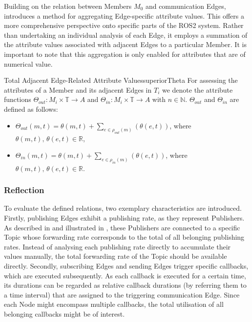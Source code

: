     Building on the relation between Members $M_0$ and communication Edges,  introduces a method for aggregating Edge-specific attribute values. This offers a more comprehensive perspective onto specific parts of the ROS2 system. Rather than undertaking an individual analysis of each Edge, it employs a summation of the attribute values associated with adjacent Edges to a particular Member. It is important to note that this aggregation is only enabled for attributes that are of numerical value.
    \begin{definitionbox}{Total Adjacent Edge-Related Attribute Values}{superiorTheta}
        For assessing the attributes of a Member and its adjacent Edges in $T_i$ we denote the attribute functions $\Theta_{out}: M_i\times\mathbb{T} \rightarrow A$ and $\Theta_{in}: M_i\times\mathbb{T} \rightarrow A$ with $n\in \mathbb{N}$. \newline $\Theta_{out}$ and $\Theta_{in}$ are defined as follows:
            \begin{itemize}[label=$\circ$]
                \item $\Theta_{out}(m,t) = \theta(m,t) + \sum\limits_{e\in \rho_{out}(m)}(\theta(e,t))$, where $\theta(m,t),\,\theta(e,t) \in \mathbb{R}$,
                \item $\Theta_{in}(m,t) = \theta(m,t) + \sum\limits_{e\in \rho_{in}(m)}(\theta(e,t))$,\hspace{.255cm} where $\theta(m,t),\,\theta(e,t) \in \mathbb{R}$.
            \end{itemize}
    \end{definitionbox}


    \subsubsection{Reflection}
    To evaluate the defined relations, two exemplary characteristics are introduced.\newline
    Firstly, publishing Edges exhibit a publishing rate, as they represent Publishers. As described in  and illustrated in , these Publishers are connected to a specific Topic whose forwarding rate corresponds to the total of all belonging publishing rates. Instead of analysing each publishing rate directly to accumulate their values manually, the total forwarding rate of the Topic should be available directly.\newline
    Secondly, subscribing Edges and sending Edges trigger specific callbacks, which are executed subsequently. As each callback is executed for a certain time, its durations can be regarded as relative callback durations (by referring them to a time interval) that are assigned to the triggering communication Edge. Since each Node might encompass multiple callbacks, the total utilisation of all belonging callbacks might be of interest.

